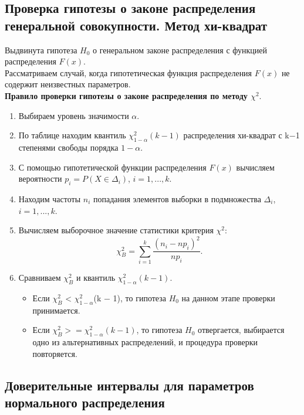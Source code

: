 \subsection{Проверка гипотезы о законе распределения генеральной совокупности. Метод хи-квадрат}
\begin{flushleft}
	Выдвинута гипотеза $H_{0}$ о генеральном законе распределения с функцией распределения $F(x)$.\\
	Рассматриваем случай, когда гипотетическая функция распределения $F(x)$ не содержит неизвестных параметров.\\
	\textbf{Правило проверки гипотезы о законе распределения по методу $\chi^{2}$}.\\
	\begin{enumerate}
		\item Выбираем уровень значимости $\alpha$.
		\item По таблице \cite[с.~358]{3} находим квантиль $\chi^{2}_{1-\alpha}(k - 1)$ распределения хи-квадрат с k$-$1 степенями свободы порядка $1-\alpha$.
		\item С помощью гипотетической функции распределения $F(x)$ вычисляем вероятности $p_{i} = P (X \in \Delta_{i})$, $i = 1, ... ,k$.
		\item Находим частоты $n_{i}$ попадания элементов выборки в подмножества $\Delta_{i}$, $i = 1, ... ,k$.
		\item Вычисляем выборочное значение статистики критерия $\chi^{2}$:
		\begin{equation}
			\chi^{2}_{B} =\sum_{i = 1}^{k}{\frac{(n_{i} - np_{i})^{2}}{np_{i}}}.
			\label{chi_B}
		\end{equation}
		\item Сравниваем $\chi^{2}_{B}$ и квантиль $\chi^{2}_{1-\alpha}(k-1)$.
		\begin{itemize}
			\item Если $\chi^{2}_{B}$ < $\chi^{2}_{1-\alpha}$(k $-$ 1), то гипотеза $H_{0}$ на данном этапе проверки принимается.
			\item Если $\chi^{2}_{B} >= \chi^{2}_{1-\alpha}(k -1)$, то гипотеза $H_{0}$ отвергается, выбирается одно из альтернативных распределений, и процедура проверки повторяется.
		\end{itemize}
	\end{enumerate}
\end{flushleft}

\subsection{Доверительные интервалы для параметров нормального распределения}
